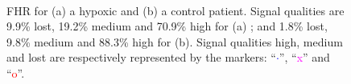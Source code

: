 \begin{figure}[tp]
\centering%
\\%
\caption{FHR for (a) a hypoxic and (b) a control patient. Signal qualities are 9.9\% lost, 19.2\% medium and 70.9\% high for (a) ; and 1.8\% lost, 9.8\% medium and 88.3\% high for (b).  Signal qualities  high, medium and lost  are respectively represented by the markers: ``\textcolor{blue}{$\cdot$}'', ``\textcolor{magenta}{x}'' and ``\textcolor{red}{o}''.}
\label{fig:RAWFHR}
\end{figure}


